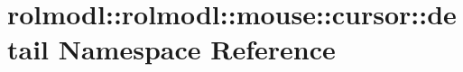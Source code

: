 \hypertarget{namespacerolmodl_1_1rolmodl_1_1mouse_1_1cursor_1_1detail}{}\section{rolmodl\+::rolmodl\+::mouse\+::cursor\+::detail Namespace Reference}
\label{namespacerolmodl_1_1rolmodl_1_1mouse_1_1cursor_1_1detail}
